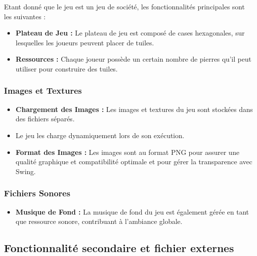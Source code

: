 \documentclass{article}
\begin{document}
    Etant donné que le jeu est un jeu de société, les fonctionnalités principales sont les suivantes :
    \begin{itemize}
        \item \textbf{Plateau de Jeu :} Le plateau de jeu est composé de cases hexagonales, sur lesquelles les joueurs peuvent placer de tuiles.
        \item \textbf{Ressources :} Chaque joueur possède un certain nombre de pierres qu'il peut utiliser pour construire des tuiles. \end{itemize}

    \subsubsection*{Images et Textures}

    \begin{itemize}
        \item \textbf{Chargement des Images :} Les images et textures du jeu sont stockées dans des fichiers séparés.

        \item Le jeu les charge dynamiquement lors de son exécution.

        \item \textbf{Format des Images :} Les images sont au format PNG pour assurer une qualité graphique et compatibilité optimale et pour gérer la transparence avec Swing.
    \end{itemize}

    \subsubsection*{Fichiers Sonores}

    \begin{itemize}
        \item \textbf{Musique de Fond :} La musique de fond du jeu est également gérée en tant que ressource sonore, contribuant à l'ambiance globale.
    \end{itemize}

    \subsection{Fonctionnalité secondaire et fichier externes}\label{subsec:fonctionnalites-secondaires}
\end{document}
